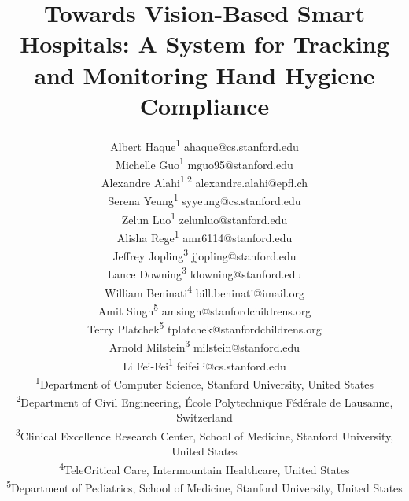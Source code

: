 \documentclass[twoside,11pt]{article}
\begin{document}
\title{Towards Vision-Based Smart Hospitals: A System for Tracking and Monitoring Hand Hygiene Compliance}

\author{\name Albert Haque\textsuperscript{1} \email ahaque@cs.stanford.edu \\
\name Michelle Guo\textsuperscript{1} \email mguo95@stanford.edu \\
\name Alexandre Alahi\textsuperscript{1,2} \email alexandre.alahi@epfl.ch \\
\name Serena Yeung\textsuperscript{1} \email syyeung@cs.stanford.edu \\
\name Zelun Luo\textsuperscript{1} \email zelunluo@stanford.edu \\
\name Alisha Rege\textsuperscript{1} \email amr6114@stanford.edu \\
\name Jeffrey Jopling\textsuperscript{3} \email jjopling@stanford.edu \\
\name Lance Downing\textsuperscript{3} \email ldowning@stanford.edu \\
\name William Beninati\textsuperscript{4} \email bill.beninati@imail.org \\
\name Amit Singh\textsuperscript{5} \email amsingh@stanfordchildrens.org \\
\name Terry Platchek\textsuperscript{5} \email tplatchek@stanfordchildrens.org \\
\name Arnold Milstein\textsuperscript{3} \email milstein@stanford.edu \\
\name Li Fei-Fei\textsuperscript{1} \email feifeili@cs.stanford.edu \\
\addr \textsuperscript{1}Department of Computer Science, Stanford University, United States \\
\addr \textsuperscript{2}Department of Civil Engineering, \'{E}cole Polytechnique F\'{e}d\'{e}rale de Lausanne, Switzerland \\
\addr \textsuperscript{3}Clinical Excellence Research Center, School of Medicine, Stanford University, United States \\
\addr \textsuperscript{4}TeleCritical Care, Intermountain Healthcare, United States \\
\addr \textsuperscript{5}Department of Pediatrics, School of Medicine, Stanford University, United States
} 
       
\maketitle
\renewcommand*{\thefootnote}{\fnsymbol{footnote}}
\renewcommand*{\thefootnote}{\arabic{footnote}}
\end{document}
